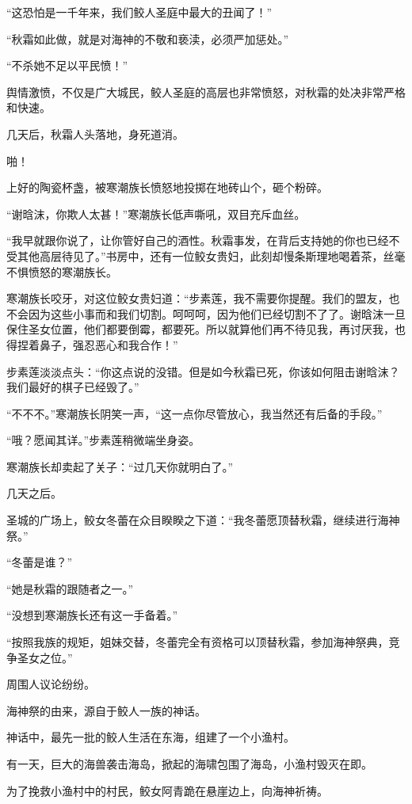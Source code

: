 \begin{this_body}
“这恐怕是一千年来，我们鲛人圣庭中最大的丑闻了！”

“秋霜如此做，就是对海神的不敬和亵渎，必须严加惩处。”

“不杀她不足以平民愤！”

舆情激愤，不仅是广大城民，鲛人圣庭的高层也非常愤怒，对秋霜的处决非常严格和快速。

几天后，秋霜人头落地，身死道消。

啪！

上好的陶瓷杯盏，被寒潮族长愤怒地投掷在地砖山个，砸个粉碎。

“谢晗沫，你欺人太甚！”寒潮族长低声嘶吼，双目充斥血丝。

“我早就跟你说了，让你管好自己的酒性。秋霜事发，在背后支持她的你也已经不受其他高层待见了。”书房中，还有一位鲛女贵妇，此刻却慢条斯理地喝着茶，丝毫不惧愤怒的寒潮族长。

寒潮族长咬牙，对这位鲛女贵妇道：“步素莲，我不需要你提醒。我们的盟友，也不会因为这些小事而和我们切割。呵呵呵，因为他们已经切割不了了。谢晗沫一旦保住圣女位置，他们都要倒霉，都要死。所以就算他们再不待见我，再讨厌我，也得捏着鼻子，强忍恶心和我合作！”

步素莲淡淡点头：“你这点说的没错。但是如今秋霜已死，你该如何阻击谢晗沫？我们最好的棋子已经毁了。”

“不不不。”寒潮族长阴笑一声，“这一点你尽管放心，我当然还有后备的手段。”

“哦？愿闻其详。”步素莲稍微端坐身姿。

寒潮族长却卖起了关子：“过几天你就明白了。”

几天之后。

圣城的广场上，鲛女冬蕾在众目睽睽之下道：“我冬蕾愿顶替秋霜，继续进行海神祭。”

“冬蕾是谁？”

“她是秋霜的跟随者之一。”

“没想到寒潮族长还有这一手备着。”

“按照我族的规矩，姐妹交替，冬蕾完全有资格可以顶替秋霜，参加海神祭典，竞争圣女之位。”

周围人议论纷纷。

海神祭的由来，源自于鲛人一族的神话。

神话中，最先一批的鲛人生活在东海，组建了一个小渔村。

有一天，巨大的海兽袭击海岛，掀起的海啸包围了海岛，小渔村毁灭在即。

为了挽救小渔村中的村民，鲛女阿青跪在悬崖边上，向海神祈祷。


\end{this_body}
